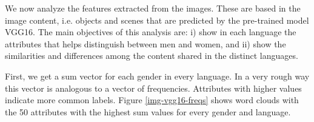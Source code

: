 \documentclass[runningheads]{llncs}
\begin{document}
We now analyze the features extracted from the images. These
are based in the image content, i.e. objects and scenes that
are predicted by the pre-trained model VGG16.
The main objectives of this analysis are: i) show in each language the attributes that helps distinguish between men and women, and ii) show the similarities
and differences among the content shared in the distinct languages.

First, we get a sum vector for each gender in every language.
In a very rough way
this vector is  analogous to a vector of frequencies.
Attributes with higher values indicate more common labels.
Figure \ref{img-vgg16-freqs} shows word clouds with
the 50 attributes with the highest sum values for every gender and language.
\end{document}
